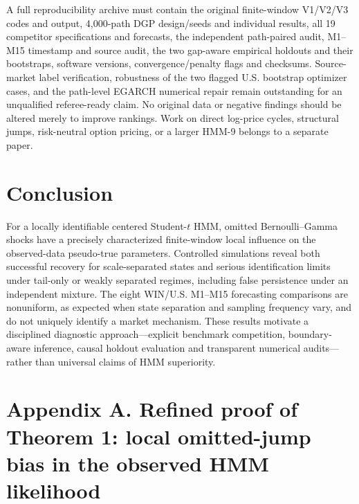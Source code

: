 \documentclass[11pt,a4paper]{article}
\begin{document}
A full reproducibility archive must contain the original finite-window V1/V2/V3 codes and output, 4,000-path DGP design/seeds and individual results, all 19 competitor specifications and forecasts, the independent path-paired audit, M1--M15 timestamp and source audit, the two gap-aware empirical holdouts and their bootstraps, software versions, convergence/penalty flags and checksums. Source-market label verification, robustness of the two flagged U.S. bootstrap optimizer cases, and the path-level EGARCH numerical repair remain outstanding for an unqualified referee-ready claim. No original data or negative findings should be altered merely to improve rankings. Work on direct log-price cycles, structural jumps, risk-neutral option pricing, or a larger HMM-9 belongs to a separate paper.

\section*{Conclusion}
For a locally identifiable centered Student-$t$ HMM, omitted Bernoulli--Gamma shocks have a precisely characterized finite-window local influence on the observed-data pseudo-true parameters. Controlled simulations reveal both successful recovery for scale-separated states and serious identification limits under tail-only or weakly separated regimes, including false persistence under an independent mixture. The eight WIN/U.S. M1--M15 forecasting comparisons are nonuniform, as expected when state separation and sampling frequency vary, and do not uniquely identify a market mechanism. These results motivate a disciplined diagnostic approach---explicit benchmark competition, boundary-aware inference, causal holdout evaluation and transparent numerical audits---rather than universal claims of HMM superiority.\par
\section*{Appendix A. Refined proof of Theorem 1: local omitted-jump bias in the observed HMM likelihood}\label{app:proof}
\end{document}
